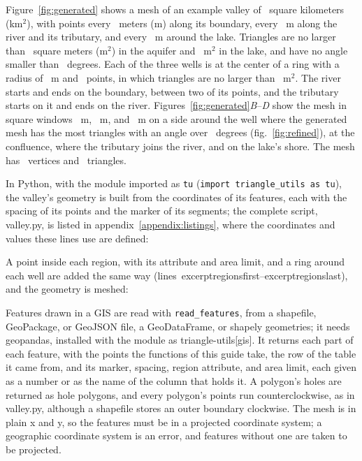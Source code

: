 \documentclass[11pt,twoside,twocolumn]{usgsreport}
\newcommand{\codelead}{\par\vskip 0pt plus 7\baselineskip\penalty -250\vskip 0pt plus -7\baselineskip}
\newcommand{\excerpt}[2]{\VerbatimInput[fontsize=\small,numbers=left,numbersep=6pt,firstnumber=\csname excerpt#1first\endcsname,firstline=\csname excerpt#1first\endcsname,lastline=\csname excerpt#1last\endcsname]{#2}}
\newcommand{\excerptlines}[1]{lines~\csname excerpt#1first\endcsname--\csname excerpt#1last\endcsname}
\begin{document}
Figure~\ref{fig:generated} shows a mesh of an example valley of \valleyarea\ square kilometers (km$^2$), with points every \boundaryspacing\ meters (m) along its boundary, every \riverspacing~m along the river and its tributary, and every \lakespacing~m around the lake. Triangles are no larger than \maximumarea\ square meters (m$^2$) in the aquifer and \lakearea~m$^2$ in the lake, and have no angle smaller than \minimumangle\ degrees. Each of the three wells is at the center of a ring with a radius of \wellradius~m and \wellpoints\ points, in which triangles are no larger than \wellarea~m$^2$. The river starts and ends on the boundary, between two of its points, and the tributary starts on it and ends on the river. Figures~\ref{fig:generated}\textit{B}--\textit{D} show the mesh in square windows \wellwindow~m, \riverwindow~m, and \lakewindow~m on a side around the well where the generated mesh has the most triangles with an angle over \maximumangle\ degrees (fig.~\ref{fig:refined}), at the confluence, where the tributary joins the river, and on the lake's shore. The mesh has \generatedvertices\ vertices and \generatedtriangles\ triangles.

\codelead
In Python, with the module imported as \texttt{tu} (\texttt{import triangle\_utils as tu}), the valley's geometry is built from the coordinates of its features, each with the spacing of its points and the marker of its segments; the complete script, valley.py, is listed in appendix~\ref{appendix:listings}, where the coordinates and values these lines use are defined:

\excerpt{geometry}{valley.py}

\codelead
\noindent A point inside each region, with its attribute and area limit, and a ring around each well are added the same way (\excerptlines{regions}), and the geometry is meshed:

\excerpt{generate}{valley.py}

Features drawn in a GIS are read with \texttt{read\_features}, from a shapefile, GeoPackage, or GeoJSON file, a GeoDataFrame, or shapely geometries; it needs geopandas, installed with the module as triangle-utils[gis]. It returns each part of each feature, with the points the functions of this guide take, the row of the table it came from, and its marker, spacing, region attribute, and area limit, each given as a number or as the name of the column that holds it. A polygon's holes are returned as hole polygons, and every polygon's points run counterclockwise, as in valley.py, although a shapefile stores an outer boundary clockwise. The mesh is in plain x and y, so the features must be in a projected coordinate system; a geographic coordinate system is an error, and features without one are taken to be projected.
\end{document}
